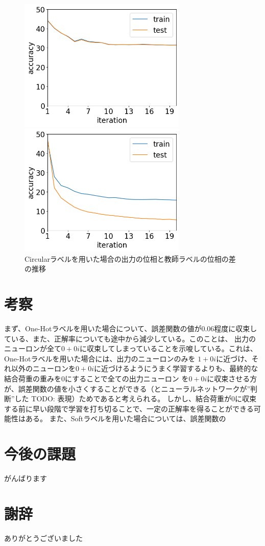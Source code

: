 \documentclass[11pt,a4paper,uplatex]{ujarticle}
\begin{document}
  \begin{figure}[tbp]
    \begin{minipage}[b]{0.495\textwidth}
      \centering
      \includegraphics[keepaspectratio, width=80mm]{Images/python/avg_202402052108.png}
    \end{minipage}
    \begin{minipage}[b]{0.495\textwidth}
      \centering
      \includegraphics[keepaspectratio, width=80mm]{Images/python/avg_202402052149.png}
    \end{minipage}
    \caption{Circularラベルを用いた場合の出力の位相と教師ラベルの位相の差の推移}
  \end{figure}
\section{考察}
  まず、One-Hotラベルを用いた場合について、誤差関数の値が0.06程度に収束している、また、正解率についても途中から減少している。このことは、
  出力のニューロンが全て$0 + 0i$に収束してしまっていることを示唆している。これは、One-Hotラベルを用いた場合には、出力のニューロンのみを
  $1 + 0i$に近づけ、それ以外のニューロンを$0 + 0i$に近づけるようにうまく学習するよりも、最終的な結合荷重の重みを0にすることで全ての出力ニューロン
  を$0 + 0i$に収束させる方が、誤差関数の値を小さくすることができる（とニューラルネットワークが”判断”した TODO: 表現）ためであると考えられる。
  しかし、結合荷重が0に収束する前に早い段階で学習を打ち切ることで、一定の正解率を得ることができる可能性はある。
  また、Softラベルを用いた場合については、誤差関数の

\section{今後の課題}
  がんばります
\newpage
\section{謝辞}
  ありがとうございました


\end{document}
